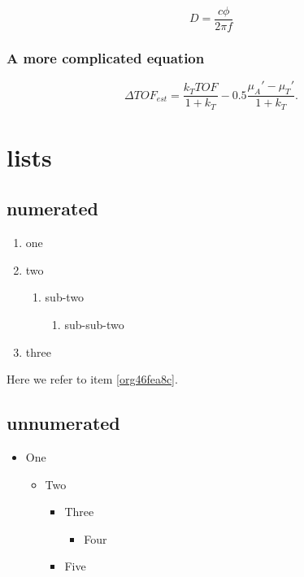 \begin{equation}
\label{eq:orgcfc0044}
D = \frac{c\phi}{2\pi f}
\end{equation}

\subsubsection{A more complicated equation}
\label{sec:org756a47b}

\begin{equation}
\Delta TOF_{est} = \frac{k_T TOF}{1+k_T } - 0.5 \frac{\mu_A' - \mu_T'}{1+k_T}.
\end{equation}

\section{lists}
\label{sec:orgbe76d66}
\subsection{numerated}
\label{sec:org0b1ecaf}
\begin{enumerate}
\item one
\item two
\begin{enumerate}
\item sub-two
\begin{enumerate}
\item sub-sub-two
\end{enumerate}
\end{enumerate}
\item \label{org46fea8c}three
\end{enumerate}

Here we refer to item \ref{org46fea8c}.

\subsection{unnumerated}
\label{sec:org9fd951f}
\begin{itemize}
\item One
\begin{itemize}
\item Two
\begin{itemize}
\item Three
\begin{itemize}
\item Four
\end{itemize}
\item Five
\end{itemize}
\end{itemize}
\end{itemize}


